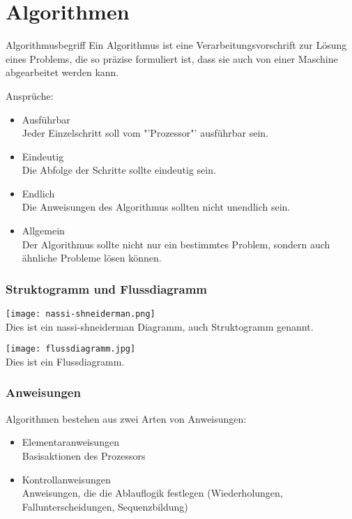 \part{Algorithmen}
\begin{zitat}{Algorithmusbegriff}
Ein Algorithmus ist eine Verarbeitungsvorschrift zur Lösung eines Problems, die so präzise formuliert ist, dass sie auch von einer Maschine abgearbeitet werden kann.
\end{zitat}

Ansprüche:
\begin{itemize}
    \item{Ausführbar}\\
    Jeder Einzelschritt soll vom "'Prozessor"' ausführbar sein.
    \item{Eindeutig}\\
    Die Abfolge der Schritte sollte eindeutig sein.
    \item{Endlich}\\
    Die Anweisungen des Algorithmus sollten nicht unendlich sein.
    \item{Allgemein}\\
    Der Algorithmus sollte nicht nur ein bestimmtes Problem, sondern auch ähnliche Probleme lösen können.
\end{itemize}

\section{Struktogramm und Flussdiagramm}
\texttt{[image: nassi-shneiderman.png]}\\
Dies ist ein nassi-shneiderman Diagramm, auch Struktogramm genannt.

\texttt{[image: flussdiagramm.jpg]}\\
Dies ist ein Flussdiagramm.
\newpage
\section{Anweisungen}
Algorithmen bestehen aus zwei Arten von Anweisungen:
\begin{itemize}
    \item{Elementaranweisungen} \\
    Basisaktionen des Prozessors
    \item{Kontrollanweisungen}\\
    Anweisungen, die die Ablauflogik festlegen (Wiederholungen, Fallunterscheidungen, Sequenzbildung)
\end{itemize}

